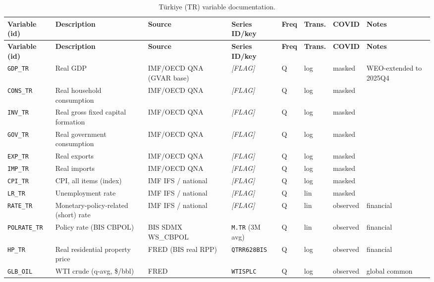 {\footnotesize
\begin{longtable}{p{2.3cm}p{3.3cm}p{2.1cm}p{2.2cm}p{0.6cm}p{1.4cm}p{1.9cm}p{2.4cm}}
\caption{T\"urkiye (TR) variable documentation.}\label{tab:data:TR}\\
\toprule
\textbf{Variable (id)} & \textbf{Description} & \textbf{Source} & \textbf{Series ID/key} & \textbf{Freq} & \textbf{Trans.} & \textbf{COVID} & \textbf{Notes} \\
\midrule
\endfirsthead
\toprule
\textbf{Variable (id)} & \textbf{Description} & \textbf{Source} & \textbf{Series ID/key} & \textbf{Freq} & \textbf{Trans.} & \textbf{COVID} & \textbf{Notes} \\
\midrule
\endhead
\bottomrule
\endfoot
\texttt{GDP\_TR}    & Real GDP                              & IMF/OECD QNA (GVAR base) & \textit{[FLAG]} & Q & log & masked & WEO-extended to 2025Q4 \\
\texttt{CONS\_TR}   & Real household consumption            & IMF/OECD QNA & \textit{[FLAG]} & Q & log & masked & \\
\texttt{INV\_TR}    & Real gross fixed capital formation    & IMF/OECD QNA & \textit{[FLAG]} & Q & log & masked & \\
\texttt{GOV\_TR}    & Real government consumption           & IMF/OECD QNA & \textit{[FLAG]} & Q & log & masked & \\
\texttt{EXP\_TR}    & Real exports                          & IMF/OECD QNA & \textit{[FLAG]} & Q & log & masked & \\
\texttt{IMP\_TR}    & Real imports                          & IMF/OECD QNA & \textit{[FLAG]} & Q & log & masked & \\
\texttt{CPI\_TR}    & CPI, all items (index)                & IMF IFS / national & \textit{[FLAG]} & Q & log & masked & \\
\texttt{LR\_TR}     & Unemployment rate                     & IMF IFS / national & \textit{[FLAG]} & Q & lin & masked & \\
\texttt{RATE\_TR}   & Monetary-policy-related (short) rate  & IMF IFS / national & \textit{[FLAG]} & Q & lin & observed & financial \\
\texttt{POLRATE\_TR}& Policy rate (BIS CBPOL)               & BIS SDMX WS\_CBPOL & \texttt{M.TR} (3M avg) & Q & lin & observed & financial \\
\texttt{HP\_TR}     & Real residential property price       & FRED (BIS real RPP) & \texttt{QTRR628BIS} & Q & log & observed & financial \\
\texttt{GLB\_OIL}   & WTI crude (q-avg, \$/bbl)             & FRED & \texttt{WTISPLC} & Q & log & observed & global common \\

\end{longtable}}
